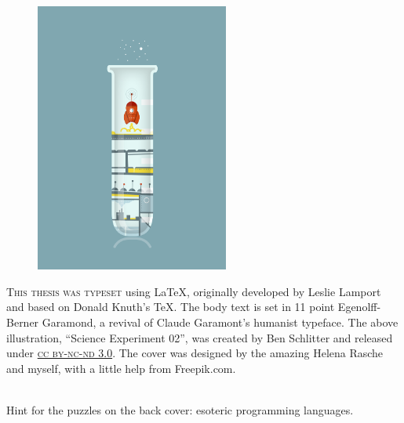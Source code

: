 
\begin{figure}
  \vspace{50pt}
  \centering
    \includegraphics[width=180pt]{endmatter/colophon.png}
\end{figure}


\begin{center}
\parbox{200pt}{\lettrine[lines=3,slope=-2pt,nindent=-4pt]{\textcolor{SchoolColor}{T}}{his thesis was typeset} using \LaTeX, originally developed by Leslie Lamport and based on Donald Knuth's \TeX. The body text is set in 11 point Egenolff-Berner Garamond, a revival of Claude Garamont's humanist typeface. The above illustration, ``Science Experiment 02'', was created by Ben Schlitter and released under \href{http://creativecommons.org/licenses/by-nc-nd/3.0/}{\textsc{cc by-nc-nd 3.0}}. The cover was designed by the amazing Helena Rasche and myself, with a little help from Freepik.com.

\ \\
Hint for the puzzles on the back cover: esoteric programming languages. }
\end{center}
